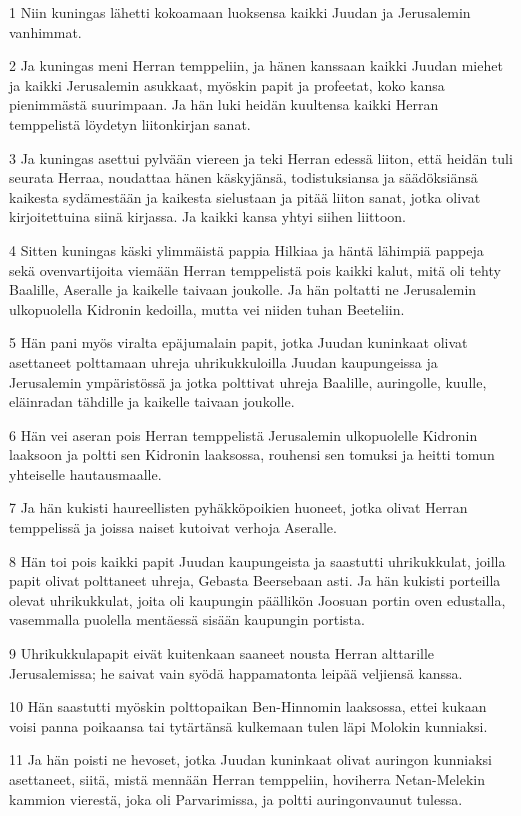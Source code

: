 \par 1 Niin kuningas lähetti kokoamaan luoksensa kaikki Juudan ja Jerusalemin vanhimmat.
\par 2 Ja kuningas meni Herran temppeliin, ja hänen kanssaan kaikki Juudan miehet ja kaikki Jerusalemin asukkaat, myöskin papit ja profeetat, koko kansa pienimmästä suurimpaan. Ja hän luki heidän kuultensa kaikki Herran temppelistä löydetyn liitonkirjan sanat.
\par 3 Ja kuningas asettui pylvään viereen ja teki Herran edessä liiton, että heidän tuli seurata Herraa, noudattaa hänen käskyjänsä, todistuksiansa ja säädöksiänsä kaikesta sydämestään ja kaikesta sielustaan ja pitää liiton sanat, jotka olivat kirjoitettuina siinä kirjassa. Ja kaikki kansa yhtyi siihen liittoon.
\par 4 Sitten kuningas käski ylimmäistä pappia Hilkiaa ja häntä lähimpiä pappeja sekä ovenvartijoita viemään Herran temppelistä pois kaikki kalut, mitä oli tehty Baalille, Aseralle ja kaikelle taivaan joukolle. Ja hän poltatti ne Jerusalemin ulkopuolella Kidronin kedoilla, mutta vei niiden tuhan Beeteliin.
\par 5 Hän pani myös viralta epäjumalain papit, jotka Juudan kuninkaat olivat asettaneet polttamaan uhreja uhrikukkuloilla Juudan kaupungeissa ja Jerusalemin ympäristössä ja jotka polttivat uhreja Baalille, auringolle, kuulle, eläinradan tähdille ja kaikelle taivaan joukolle.
\par 6 Hän vei aseran pois Herran temppelistä Jerusalemin ulkopuolelle Kidronin laaksoon ja poltti sen Kidronin laaksossa, rouhensi sen tomuksi ja heitti tomun yhteiselle hautausmaalle.
\par 7 Ja hän kukisti haureellisten pyhäkköpoikien huoneet, jotka olivat Herran temppelissä ja joissa naiset kutoivat verhoja Aseralle.
\par 8 Hän toi pois kaikki papit Juudan kaupungeista ja saastutti uhrikukkulat, joilla papit olivat polttaneet uhreja, Gebasta Beersebaan asti. Ja hän kukisti porteilla olevat uhrikukkulat, joita oli kaupungin päällikön Joosuan portin oven edustalla, vasemmalla puolella mentäessä sisään kaupungin portista.
\par 9 Uhrikukkulapapit eivät kuitenkaan saaneet nousta Herran alttarille Jerusalemissa; he saivat vain syödä happamatonta leipää veljiensä kanssa.
\par 10 Hän saastutti myöskin polttopaikan Ben-Hinnomin laaksossa, ettei kukaan voisi panna poikaansa tai tytärtänsä kulkemaan tulen läpi Molokin kunniaksi.
\par 11 Ja hän poisti ne hevoset, jotka Juudan kuninkaat olivat auringon kunniaksi asettaneet, siitä, mistä mennään Herran temppeliin, hoviherra Netan-Melekin kammion vierestä, joka oli Parvarimissa, ja poltti auringonvaunut tulessa.
